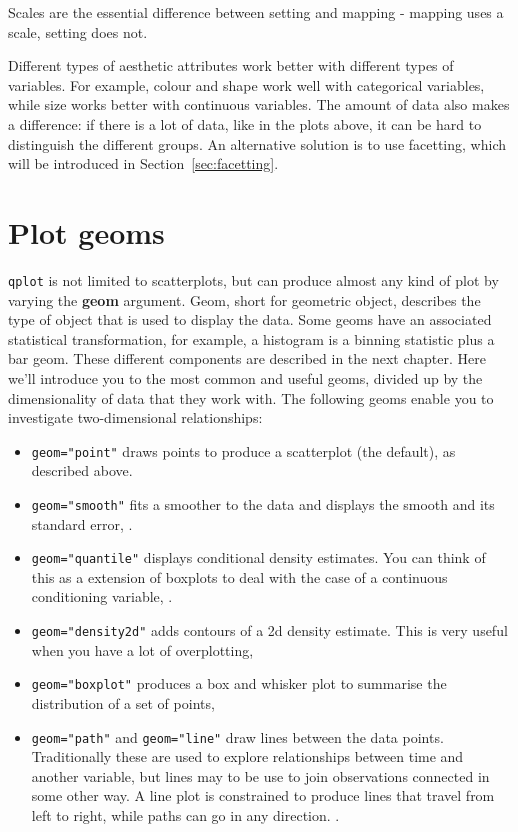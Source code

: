 Scales are the essential difference between setting and mapping - mapping uses a scale, setting does not.



Different types of aesthetic attributes work better with different types of variables.  For example, colour and shape work well with categorical variables, while size works better with continuous variables.  The amount of data also makes a difference: if there is a lot of data, like in the plots above, it can be hard to distinguish the different groups.  An alternative solution is to use facetting, which will be introduced in Section~\ref{sec:facetting}.

\section{Plot geoms}\label{sec:plot_geoms}

{\tt qplot} is not limited to scatterplots, but can produce almost any kind of plot by varying the {\bf geom} argument. Geom, short for geometric object, describes the type of object that is used to display the data.  Some geoms have an associated statistical transformation, for example, a histogram is a binning statistic plus a bar geom.  These different components are described in the next chapter.  Here we'll introduce you to the most common and useful geoms, divided up by the dimensionality of data that they work with.  The following geoms enable you to investigate two-dimensional relationships:

\begin{itemize}

  \item {\tt geom="point"} draws points to produce a scatterplot (the default), as described above.

  \item {\tt geom="smooth"} fits a smoother to the data and displays the smooth and its standard error, .

  \item {\tt geom="quantile"} displays conditional density estimates.  You can think of this as a extension of boxplots to deal with the case of a continuous conditioning variable, .

  \item {\tt geom="density2d"} adds contours of a 2d density estimate.  This is very useful when you have a lot of overplotting, 

  \item {\tt geom="boxplot"} produces a box and whisker plot to summarise the distribution of a set of points, 

  \item {\tt geom="path"} and {\tt geom="line"} draw lines between the data points.  Traditionally these are used to explore relationships between time and another variable, but lines may to be use to join observations connected in some other way.  A line plot is constrained to produce lines that travel from left to right, while paths can go in any direction.  .
\end{itemize}

